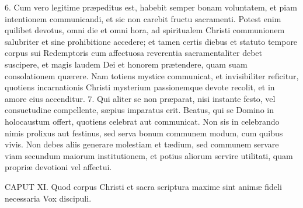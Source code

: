 \documentclass[twoside]{article}
\begin{document}
6. Cum vero legitime præpeditus est, habebit semper bonam voluntatem, et piam intentionem communicandi, et sic non carebit fructu sacramenti. Potest enim quilibet devotus, omni die et omni hora, ad spiritualem Christi communionem salubriter et sine prohibitione accedere; et tamen certis diebus et statuto tempore corpus sui Redemptoris cum affectuosa reverentia sacramentaliter debet suscipere, et magis laudem Dei et honorem prætendere, quam suam consolationem quærere. Nam totiens mystice communicat, et invisibiliter reficitur, quotiens incarnationis Christi mysterium passionemque devote recolit, et in amore eius accenditur.
7. Qui aliter se non præparat, nisi instante festo, vel consuetudine compellente, sæpius imparatus erit. Beatus, qui se Domino in holocaustum offert, quotiens celebrat aut communicat. Non sis in celebrando nimis prolixus aut festinus, sed serva bonum communem modum, cum quibus vivis. Non debes aliis generare molestiam et tædium, sed communem servare viam secundum maiorum institutionem, et potius aliorum servire utilitati, quam propriæ devotioni vel affectui.


CAPUT XI.
Quod corpus Christi et sacra scriptura maxime sint animæ fideli necessaria
Vox discipuli.
\end{document}
